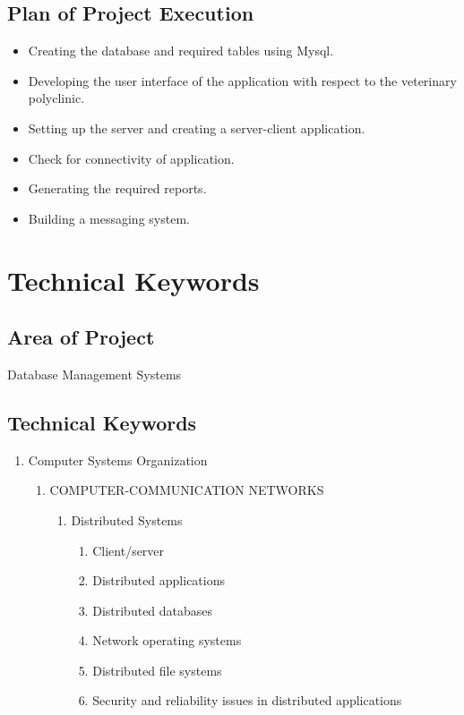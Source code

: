 \documentclass[oneside,a4paper,12pt]{book}
\begin{document}
\section{Plan of Project Execution}
 \begin{itemize}
 \item Creating the database and required tables using Mysql.
 \item Developing the user interface of the application with respect to the veterinary polyclinic.
 \item Setting up the server and creating a server-client application.
 \item Check for connectivity of application.
 \item Generating the required reports.
 \item Building a messaging system.
 \end{itemize}



\chapter{Technical Keywords}
\section{Area of Project}
Database Management Systems

\section{Technical Keywords}


\begin{enumerate}
	\item  Computer Systems Organization 
	\begin{enumerate}
		\item  COMPUTER-COMMUNICATION NETWORKS 
		\begin{enumerate}
			\item  Distributed Systems 
			\begin{enumerate}
				\item  Client/server 
\item Distributed applications
\item Distributed databases
\item Network operating systems 
\item Distributed file systems
\item Security and reliability issues in distributed applications
	 		\end{enumerate} 
		\end{enumerate} 
	  

	
	\end{enumerate}
\end{enumerate}
\end{document}
